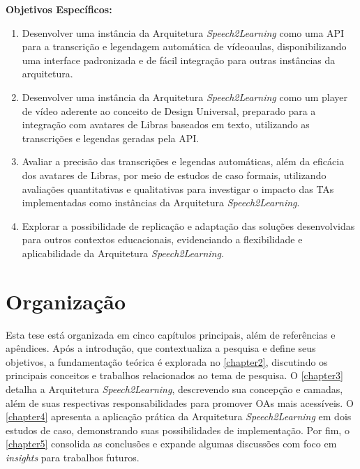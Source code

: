 \textbf{Objetivos Específicos:}

\begin{enumerate}
\item Desenvolver uma instância da Arquitetura \textit{Speech2Learning} como uma API para a transcrição e legendagem automática de vídeoaulas, disponibilizando uma interface padronizada e de fácil integração para outras instâncias da arquitetura.
\item Desenvolver uma instância da Arquitetura \textit{Speech2Learning} como um player de vídeo aderente ao conceito de Design Universal, preparado para a integração com avatares de Libras baseados em texto, utilizando as transcrições e legendas geradas pela API.
\item Avaliar a precisão das transcrições e legendas automáticas, além da eficácia dos avatares de Libras, por meio de estudos de caso formais, utilizando avaliações quantitativas e qualitativas para investigar o impacto das TAs implementadas como instâncias da Arquitetura \textit{Speech2Learning}.
\item Explorar a possibilidade de replicação e adaptação das soluções desenvolvidas para outros contextos educacionais, evidenciando a flexibilidade e aplicabilidade da Arquitetura \textit{Speech2Learning}.
\end{enumerate}

\section{Organização}

Esta tese está organizada em cinco capítulos principais, além de referências e apêndices. Após a introdução, que contextualiza a pesquisa e define seus objetivos, a fundamentação teórica é explorada no \autoref{chapter2}, discutindo os principais conceitos e trabalhos relacionados ao tema de pesquisa. O \autoref{chapter3} detalha a Arquitetura \textit{Speech2Learning}, descrevendo sua concepção e camadas, além de suas respectivas responsabilidades para promover OAs mais acessíveis. O \autoref{chapter4} apresenta a aplicação prática da Arquitetura \textit{Speech2Learning} em dois estudos de caso, demonstrando suas possibilidades de implementação. Por fim, o \autoref{chapter5} consolida as conclusões e expande algumas discussões com foco em \textit{insights} para trabalhos futuros.